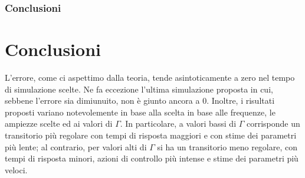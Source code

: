 \documentclass{beamer}
\begin{document}
\begin{frame}
\begin{figure}
        \hspace{0.2cm}
    \end{figure}
\end{frame}
\begin{frame}
	\frametitle{Conclusioni}
	\section{Conclusioni}
    L'errore, come ci aspettimo dalla teoria, tende asintoticamente a zero nel tempo di simulazione scelte. Ne fa eccezione l'ultima simulazione proposta in cui, sebbene l'errore sia dimiunuito, non è giunto ancora a 0. Inoltre, i risultati proposti variano notevolemente in base alla scelta in base alle frequenze, le ampiezze scelte ed ai valori di \(\Gamma \). In particolare, a valori bassi di \(\Gamma \) corrisponde un transitorio più regolare con tempi di risposta maggiori e con stime dei parametri più lente; al contrario, per valori alti di \(\Gamma \) si ha un transitorio meno regolare, con tempi di risposta minori, azioni di controllo più intense e stime dei parametri più veloci.
\end{frame}
\end{document}
